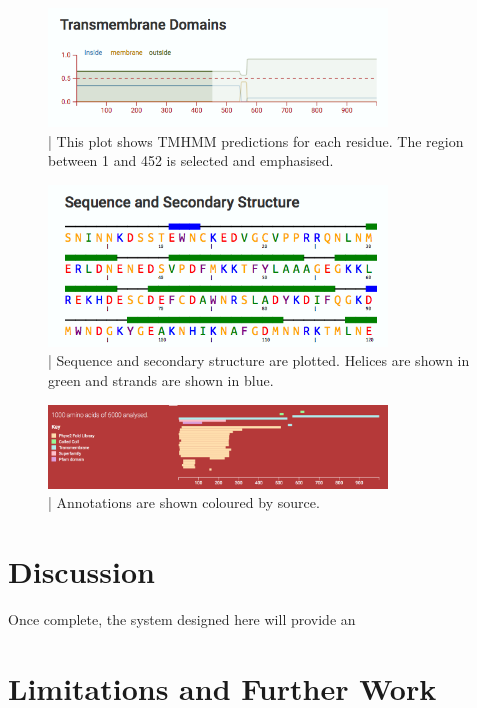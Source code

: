 \documentclass[fleqn,10pt]{article} %
\begin{document}
\begin{figure}
\includegraphics[width=9cm]{figs/seriesgroupplot}
\caption{ | This plot shows TMHMM predictions for each residue. The region between 1 and 452 is selected and emphasised.}
\end{figure}

\begin{figure}
\includegraphics[width=9cm]{figs/secondarystructureplot}
\caption{ | Sequence and secondary structure are plotted. Helices are shown in green and strands are shown in blue.}
\end{figure}

\begin{figure}
\includegraphics[width=9cm]{figs/annotationplot}
\caption{ | Annotations are shown coloured by source.}
\end{figure}

\section{Discussion}

Once complete, the system designed here will provide an 



\section{Limitations and Further Work}
\end{document}
